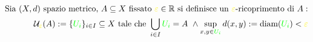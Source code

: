 \documentclass[preview]{standalone}
\begin{document}
\begin{align*}
\text{Sia } (X, d) \text{ spazio metrico, } A \subseteq X \text{ fissato } \textcolor{yellow}{\varepsilon} \in \mathbb{R} \text{ si definisce un } \textcolor{yellow}{\varepsilon}\text{-ricoprimento di } A: \\ \mathcal{U}_{\textcolor{yellow}{\varepsilon}}(A) := \{\textcolor{green}{U_i}\}_{i \in I} \subseteq X \text{ tale che } \bigcup_{i \in I} \textcolor{green}{U_i} = A \ \land \sup_{x,y \in \textcolor{green}{U_i}} d(x,y) := \text{diam}(\textcolor{green}{U_i}) < \textcolor{yellow}{\varepsilon}
\end{align*}
\end{document}
